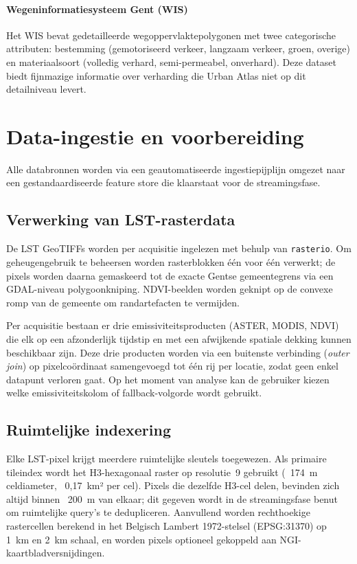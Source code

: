 \paragraph{Wegeninformatiesysteem Gent (WIS)}
Het WIS bevat gedetailleerde wegoppervlaktepolygonen met twee categorische attributen: bestemming (gemotoriseerd verkeer, langzaam verkeer, groen, overige) en materiaalsoort (volledig verhard, semi-permeabel, onverhard).
Deze dataset biedt fijnmazige informatie over verharding die Urban Atlas niet op dit detailniveau levert.

\section{Data-ingestie en voorbereiding}
\label{sec:ingestie}

Alle databronnen worden via een geautomatiseerde ingestiepijplijn omgezet naar een gestandaardiseerde feature store die klaarstaat voor de streamingsfase.

\subsection{Verwerking van LST-rasterdata}

De LST GeoTIFFs worden per acquisitie ingelezen met behulp van \texttt{rasterio}.
Om geheugengebruik te beheersen worden rasterblokken één voor één verwerkt; de pixels worden daarna gemaskeerd tot de exacte Gentse gemeentegrens via een GDAL-niveau polygoonkniping.
NDVI-beelden worden geknipt op de convexe romp van de gemeente om randartefacten te vermijden.

Per acquisitie bestaan er drie emissiviteitsproducten (ASTER, MODIS, NDVI) die elk op een afzonderlijk tijdstip en met een afwijkende spatiale dekking kunnen beschikbaar zijn.
Deze drie producten worden via een buitenste verbinding (\textit{outer join}) op pixelcoördinaat samengevoegd tot één rij per locatie, zodat geen enkel datapunt verloren gaat.
Op het moment van analyse kan de gebruiker kiezen welke emissiviteitskolom of fallback-volgorde wordt gebruikt.

\subsection{Ruimtelijke indexering}

Elke LST-pixel krijgt meerdere ruimtelijke sleutels toegewezen.
Als primaire tileindex wordt het H3-hexagonaal raster op resolutie~9 gebruikt (~174~m celdiameter, ~0,17~km² per cel).
Pixels die dezelfde H3-cel delen, bevinden zich altijd binnen ~200~m van elkaar; dit gegeven wordt in de streamingsfase benut om ruimtelijke query's te dedupliceren.
Aanvullend worden rechthoekige rastercellen berekend in het Belgisch Lambert 1972-stelsel (EPSG:31370) op 1~km en 2~km schaal, en worden pixels optioneel gekoppeld aan NGI-kaartbladversnijdingen.

